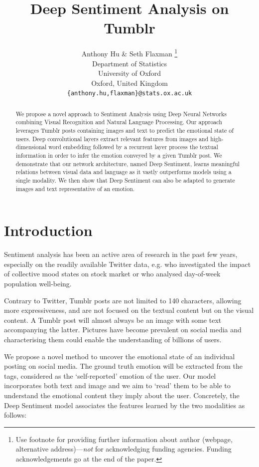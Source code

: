\documentclass{article} %
\title{Deep Sentiment Analysis on Tumblr}
\author{Anthony Hu \& Seth Flaxman \thanks{ Use footnote for providing further information
about author (webpage, alternative address)---\emph{not} for acknowledging
funding agencies.  Funding acknowledgements go at the end of the paper.} \\
Department of Statistics\\
University of Oxford\\
Oxford, United Kingdom \\
\texttt{\{anthony.hu,flaxman\}@stats.ox.ac.uk} \\
}
\begin{document}
\maketitle

\begin{abstract}
We propose a novel approach to Sentiment Analysis using Deep Neural Networks combining Visual Recognition and Natural Language Processing. Our approach leverages Tumblr posts containing images and text to predict the emotional state of users. Deep convolutional layers extract relevant features from images and high-dimensional word embedding followed by a recurrent layer process the textual information in order to infer the emotion conveyed by a given Tumblr post. We demonstrate that our network architecture, named Deep Sentiment, learns meaningful relations between visual data and language as it vastly outperforms models using a single modality. We then show that Deep Sentiment can also be adapted to generate images and text representative of an emotion. 
\end{abstract}

\section{Introduction}
Sentiment analysis has been an active area of research in the past few years, especially on the readily available Twitter data, e.g. \citet{Bollen} who investigated the impact of collective mood states on stock market or \cite{Seth-16} who analysed day-of-week population well-being.

Contrary to Twitter, Tumblr posts are not limited to 140 characters, allowing more expressiveness, and are not focused on the textual content but on the visual content. A Tumblr post will almost always be an image with some text accompanying the latter. Pictures have become prevalent on social media and characterising them could enable the understanding of billions of users. 

We propose a novel method to uncover the emotional state of an individual posting on social media. The ground truth emotion will be extracted from the tags, considered as the `self-reported' emotion of the user. Our model incorporates both text and image and we aim to `read' them to be able to understand the emotional content they imply about the user. Concretely, the Deep Sentiment model associates the features learned by the two modalities as follows:
\end{document}
